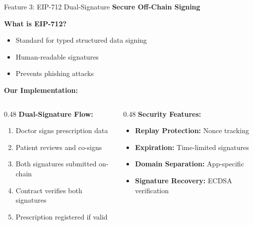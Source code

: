 \documentclass[10pt]{beamer}
\begin{document}
\begin{frame}{Feature 3: EIP-712 Dual-Signature}
\textbf{Secure Off-Chain Signing}

\vspace{0.2cm}
\textbf{What is EIP-712?}
\begin{itemize}
\item Standard for typed structured data signing
\item Human-readable signatures
\item Prevents phishing attacks
\end{itemize}

\vspace{0.2cm}
\textbf{Our Implementation:}
\begin{columns}[T]
\begin{column}{0.48\textwidth}
\textbf{Dual-Signature Flow:}
\begin{enumerate}
\item Doctor signs prescription data
\item Patient reviews and co-signs
\item Both signatures submitted on-chain
\item Contract verifies both signatures
\item Prescription registered if valid
\end{enumerate}
\end{column}

\begin{column}{0.48\textwidth}
\textbf{Security Features:}
\begin{itemize}
\item \textbf{Replay Protection:} Nonce tracking
\item \textbf{Expiration:} Time-limited signatures
\item \textbf{Domain Separation:} App-specific
\item \textbf{Signature Recovery:} ECDSA verification
\end{itemize}
\end{column}
\end{columns}
\end{frame}
\end{document}
